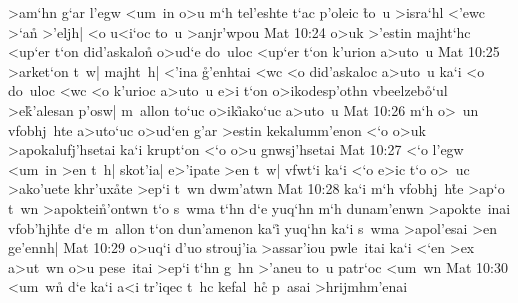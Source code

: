>am`hn
g`ar
l'egw
<um~in
o>u
m`h
tel'eshte
t`ac
p'oleic
\r{t}o~u
>isra`hl
<'ewc
>`a\r{n}
>'eljh|
<o
u<i`oc
to~u
>anjr'wpou\bibvsend
\vs Mat 10:24
o>uk
>'estin
majht`hc
<up`er
t`on
did'askalo\r{n}
o>ud`e
do~uloc
<up`er
t`on
k'urion
a>uto~u\bibvsend
\vs Mat 10:25
>arket`on
t~w|
majht~h|
<'ina
\r{g}'enhtai
<wc
<o
did'askaloc
a>uto~u
ka`i
<o
do~uloc
<wc
<o
k'urioc
a>uto~u
e>i
t`on
o>ikodesp'othn
vbeelzeb\r{o}`ul
>e\r{k}'alesan
p'osw|
m~allon
to`uc
o>ik\r{i}ako`uc
a>uto~u\bibvsend
\vs Mat 10:26
m`h
o>~un
vfobhj~hte
a>uto`uc
o>ud`en
g'ar
>estin
kekalumm'enon
<`o
o>uk
>apokalufj'hsetai
ka`i
krupt`on
<`o
o>u
gnwsj'hsetai\bibvsend
\vs Mat 10:27
<`o
l'egw
<um~in
>en
t~h|
skot'ia|
e>'ipate
>en
t~w|
vfwt`i
ka`i
<`o
e>ic
t`o
o>~uc
>ako'uete
khr'ux\r{a}te
>ep`i
t~wn
dwm'atwn\bibvsend
\vs Mat 10:28
ka`i
m`h
vfobhj~h\r{t}e
>ap`o
t~wn
>apoktei\r{n}'ontwn
t`o
s~wma
t`hn
d`e
yuq`hn
m`h
dunam'enwn
>apokte~inai
vfob'hjh\r{t}e
d`e
m~allon
t`on
dun'amenon
ka`i\r{}
yuq`hn
ka`i
s~wma
>apol'esai
>en
ge'ennh|\bibvsend
\vs Mat 10:29
o>uq`i
d'uo
strouj'ia
>assar'iou
pwle~itai
ka`i
<`en
>ex
a>ut~wn
o>u
pese~itai
>ep`i
t`hn
g~hn
>'aneu
to~u
patr`oc
<um~wn\bibvsend
\vs Mat 10:30
<um~wn\r{}
d`e
ka`i
a<i
tr'iqec
t~hc
kefal~h\r{c}
p~asai
>hrijmhm'enai
